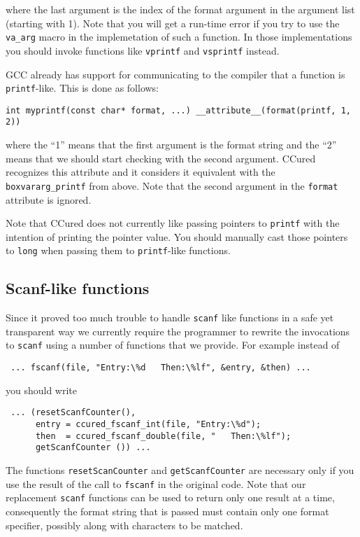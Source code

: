\documentclass{book}
\def\t#1{{\tt #1}}
\begin{document}
 where the last argument is the index of the format argument in the argument
list (starting with 1). Note that you will get a run-time error if you try to
use the \t{va\_arg} macro in the implemetation of such a function. In those
implementations you should invoke functions like \t{vprintf} and \t{vsprintf}
instead.

 GCC already has support for communicating to the compiler that a function is
\t{printf}-like. This is done as follows:
\begin{verbatim}
int myprintf(const char* format, ...) __attribute__(format(printf, 1, 2))
\end{verbatim}
 
 where the ``1'' means that the first argument is the format string and the
``2'' means that we should start checking with the second argument. CCured
recognizes this attribute and it considers it equivalent with the
\t{boxvararg\_printf} from above. Note that the second argument in the
\t{format} attribute is ignored. 

 Note that CCured does not currently like passing pointers to \t{printf} with
the intention of printing the pointer value. You should manually cast those
pointers to \t{long} when passing them to \t{printf}-like functions.

    \subsection{Scanf-like functions}

 Since it proved too much trouble to handle \t{scanf} like functions in a safe
yet transparent way we currently require the programmer to rewrite the
invocations to \t{scanf} using a number of functions that we provide. For
example instead of 
\begin{verbatim}
 ... fscanf(file, "Entry:\%d   Then:\%lf", &entry, &then) ...
\end{verbatim}

 you should write
\begin{verbatim}
 ... (resetScanfCounter(), 
      entry = ccured_fscanf_int(file, "Entry:\%d");
      then  = ccured_fscanf_double(file, "   Then:\%lf");
      getScanfCounter ()) ...
\end{verbatim}

 The functions \t{resetScanCounter} and \t{getScanfCounter} are necessary only
if you use the result of the call to \t{fscanf} in the original code. Note
that our replacement \t{scanf} functions can be used to return only one result
at a time, consequently the format string that is passed must contain only one
format specifier, possibly along with characters to be matched. 
\end{document}
